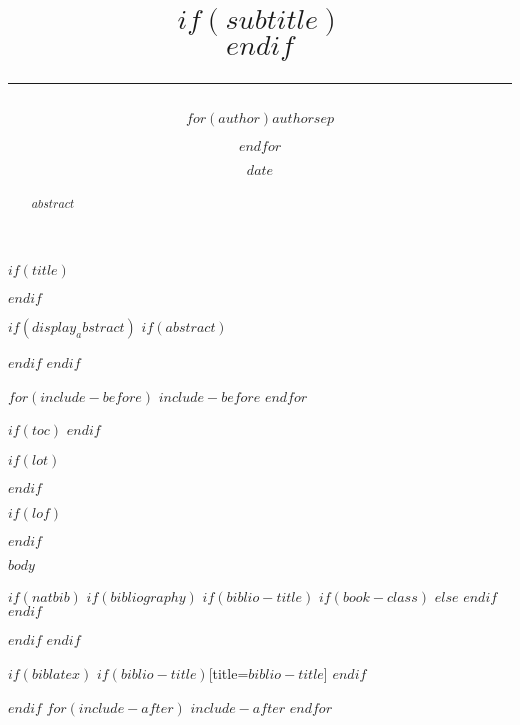 \documentclass[$if(fontsize)$$fontsize$,$endif$$if(papersize)$$papersize$,$endif$$for(classoption)$$classoption$$sep$,$endfor$]{$documentclass$}
\title{\flushright {\textcolor{rule-color}{\rule{\textwidth}{2pt}}\vspace{0.4em}\\ \bf \huge $title$}$if(subtitle)$\\\vspace{0.2em}{\Large\textcolor{subtitle-color}{$subtitle$}}$endif$ \\ \vspace{-.4em} \textcolor{rule-color}{\rule{\textwidth}{2pt}}} %
\author{\bf $for(author)$$author$$sep$ \and $endfor$}
\affil{\textit{$institute$}}
\affil{Contact: \href{mailto:$contact$}{$contact$}}
\date{$date$}
\renewcommand{\href}[2]{#2\footnote{\url{#1}}}
\begin{document}
\renewcommand{\labelitemi}{\(\bullet\)}
\renewcommand{\labelitemii}{\textendash}
\renewcommand{\labelitemiii}{\textasteriskcentered}
\renewcommand{\labelitemiii}{\textperiodcentered}




$if(title)$
{
 \thispagestyle{empty}
 \maketitle
}
$endif$

$if(display_abstract)$
$if(abstract)$
\begin{abstract}
  $abstract$
\end{abstract}
$endif$
$endif$

$for(include-before)$
$include-before$
$endfor$

$if(toc)$
{
  \setcounter{tocdepth}{$toc-depth$}
  \tableofcontents
  \newpage
}
$endif$

$if(lot)$
\listoftables
\newpage
$endif$

$if(lof)$
\listoffigures
\newpage
$endif$


$body$

$if(natbib)$
$if(bibliography)$
$if(biblio-title)$
$if(book-class)$
\renewcommand\bibname{$biblio-title$}
$else$
\renewcommand\refname{$biblio-title$}
$endif$
$endif$

$endif$
$endif$

$if(biblatex)$
\printbibliography$if(biblio-title)$[title=$biblio-title$]
$endif$

$endif$
$for(include-after)$
$include-after$
$endfor$
\end{document}
